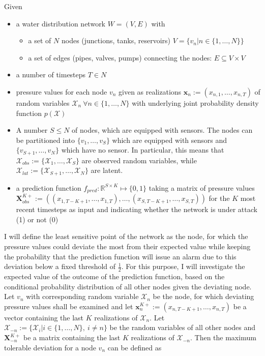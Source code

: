 \documentclass[a4paper]{article}
\newcommand{\R}[1]{\mathcal{#1}} %
\newcommand{\M}[1]{\mathbf{#1}} %
\newcommand{\V}[1]{\bm{#1}} %
\begin{document}
Given
\begin{itemize}
\item a water distribution network $W = (V,E)$ with
\begin{itemize}
\item a set of $N$ nodes (junctions, tanks, reservoirs) $V = \{ v_n | n \in \{ 1, \hdots, N \} \}$
\item a set of edges (pipes, valves, pumps) connecting the nodes: $E \subseteq V \times V$
\end{itemize}
\item a number of timesteps $T \in N$
\item pressure values for each node $v_n$ given as realizations $\V{x}_n := (x_{n,1}, \hdots, x_{n,T})$ of random variables $\R{X}_n\ \forall n \in \{ 1, \hdots, N \}$ with underlying joint probability density function $p(\R{X})$
\item A number $S \leq N$ of nodes, which are equipped with sensors. The nodes can be partitioned into $\{ v_1, \hdots, v_S \}$ which are equipped with sensors and $\{ v_{S+1}, \hdots, v_N \}$ which have no sensor. In particular, this means that $\R{X}_{obs} := \{ \R{X}_1, \hdots, \R{X}_S \}$ are observed random variables, while $\R{X}_{lat} := \{ \R{X}_{S+1}, \hdots, \R{X}_N \}$ are latent.
\item a prediction function $f_{pred} : \mathbb{R}^{S \times K} \mapsto \{ 0, 1 \}$ taking a matrix of pressure values $\M{X}_{obs}^{K+} := ((x_{1,T-K+1}, \hdots, x_{1,T}), \hdots, (x_{S,T-K+1}, \hdots, x_{S,T}))$ for the $K$ most recent timesteps as input and indicating whether the network is under attack (1) or not (0)
\end{itemize}
I will define the least sensitive point of the network as the node, for which the pressure values could deviate the most from their expected value while keeping the probability that the prediction function will issue an alarm due to this deviation below a fixed threshold of $\frac{1}{2}$. For this purpose, I will investigate the expected value of the outcome of the prediction function, based on the conditional probability distribution of all other nodes given the deviating node.\\
Let $v_n$ with corresponding random variable $\R{X}_n$ be the node, for which deviating pressure values shall be examined and let $\V{x}_n^{K+} := (x_{n,T-K+1}, \hdots, x_{n,T})$ be a vector containing the last $K$ realizations of $\R{X}_n$. Let $\R{X}_{-n} := \{ \R{X}_i | i \in \{ 1, \hdots, N \},\ i \neq n\}$ be the random variables of all other nodes and $\M{X}_{-n}^{K+}$ be a matrix containing the last $K$ realizations of $\R{X}_{-n}$. Then the maximum tolerable deviation for a node $v_n$ can be defined as
\end{document}
